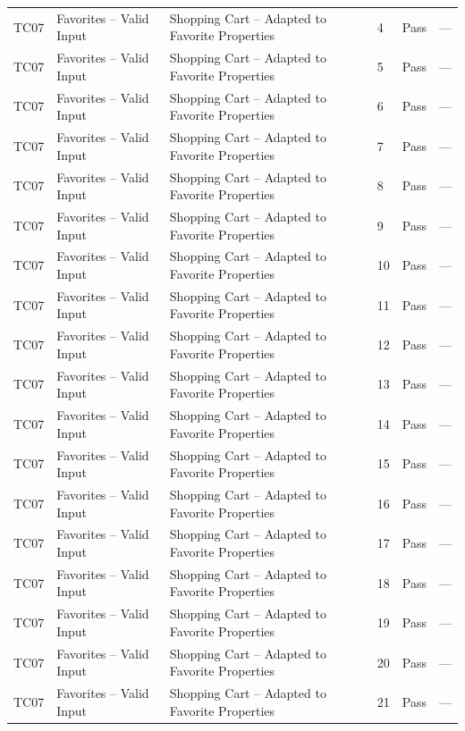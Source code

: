 {\begin{longtable}{@{}p{1.2cm} p{4.2cm} p{4.4cm} p{0.8cm} p{0.9cm} p{1.6cm}@{}}
  TC07 & Favorites -- Valid Input & Shopping Cart -- Adapted to Favorite Properties & 4 & Pass & --- \\
  TC07 & Favorites -- Valid Input & Shopping Cart -- Adapted to Favorite Properties & 5 & Pass & --- \\
  TC07 & Favorites -- Valid Input & Shopping Cart -- Adapted to Favorite Properties & 6 & Pass & --- \\
  TC07 & Favorites -- Valid Input & Shopping Cart -- Adapted to Favorite Properties & 7 & Pass & --- \\
  TC07 & Favorites -- Valid Input & Shopping Cart -- Adapted to Favorite Properties & 8 & Pass & --- \\
  TC07 & Favorites -- Valid Input & Shopping Cart -- Adapted to Favorite Properties & 9 & Pass & --- \\
  TC07 & Favorites -- Valid Input & Shopping Cart -- Adapted to Favorite Properties & 10 & Pass & --- \\
  TC07 & Favorites -- Valid Input & Shopping Cart -- Adapted to Favorite Properties & 11 & Pass & --- \\
  TC07 & Favorites -- Valid Input & Shopping Cart -- Adapted to Favorite Properties & 12 & Pass & --- \\
  TC07 & Favorites -- Valid Input & Shopping Cart -- Adapted to Favorite Properties & 13 & Pass & --- \\
  TC07 & Favorites -- Valid Input & Shopping Cart -- Adapted to Favorite Properties & 14 & Pass & --- \\
  TC07 & Favorites -- Valid Input & Shopping Cart -- Adapted to Favorite Properties & 15 & Pass & --- \\
  TC07 & Favorites -- Valid Input & Shopping Cart -- Adapted to Favorite Properties & 16 & Pass & --- \\
  TC07 & Favorites -- Valid Input & Shopping Cart -- Adapted to Favorite Properties & 17 & Pass & --- \\
  TC07 & Favorites -- Valid Input & Shopping Cart -- Adapted to Favorite Properties & 18 & Pass & --- \\
  TC07 & Favorites -- Valid Input & Shopping Cart -- Adapted to Favorite Properties & 19 & Pass & --- \\
  TC07 & Favorites -- Valid Input & Shopping Cart -- Adapted to Favorite Properties & 20 & Pass & --- \\
  TC07 & Favorites -- Valid Input & Shopping Cart -- Adapted to Favorite Properties & 21 & Pass & --- \\

\end{longtable}}
